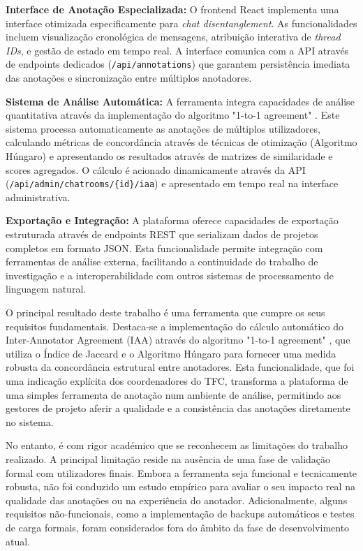 \textbf{Interface de Anotação Especializada:} O frontend React implementa uma interface otimizada especificamente para \textit{chat disentanglement}. As funcionalidades incluem visualização cronológica de mensagens, atribuição interativa de \textit{thread IDs}, e gestão de estado em tempo real. A interface comunica com a API através de endpoints dedicados (\texttt{/api/annotations}) que garantem persistência imediata das anotações e sincronização entre múltiplos anotadores.

\textbf{Sistema de Análise Automática:} A ferramenta integra capacidades de análise quantitativa através da implementação do algoritmo "1-to-1 agreement" \cite{elsner2008you}. Este sistema processa automaticamente as anotações de múltiplos utilizadores, calculando métricas de concordância através de técnicas de otimização (Algoritmo Húngaro) e apresentando os resultados através de matrizes de similaridade e scores agregados. O cálculo é acionado dinamicamente através da API (\texttt{/api/admin/chatrooms/\{id\}/iaa}) e apresentado em tempo real na interface administrativa.

\textbf{Exportação e Integração:} A plataforma oferece capacidades de exportação estruturada através de endpoints REST que serializam dados de projetos completos em formato JSON. Esta funcionalidade permite integração com ferramentas de análise externa, facilitando a continuidade do trabalho de investigação e a interoperabilidade com outros sistemas de processamento de linguagem natural.

O principal resultado deste trabalho é uma ferramenta que cumpre os seus requisitos fundamentais. Destaca-se a implementação do cálculo automático do Inter-Annotator Agreement (IAA) através do algoritmo "1-to-1 agreement" \cite{elsner2008you}, que utiliza o Índice de Jaccard e o Algoritmo Húngaro para fornecer uma medida robusta da concordância estrutural entre anotadores. Esta funcionalidade, que foi uma indicação explícita dos coordenadores do TFC, transforma a plataforma de uma simples ferramenta de anotação num ambiente de análise, permitindo aos gestores de projeto aferir a qualidade e a consistência das anotações diretamente no sistema.

No entanto, é com rigor académico que se reconhecem as limitações do trabalho realizado. A principal limitação reside na ausência de uma fase de validação formal com utilizadores finais. Embora a ferramenta seja funcional e tecnicamente robusta, não foi conduzido um estudo empírico para avaliar o seu impacto real na qualidade das anotações ou na experiência do anotador. Adicionalmente, alguns requisitos não-funcionais, como a implementação de backups automáticos e testes de carga formais, foram considerados fora do âmbito da fase de desenvolvimento atual.

